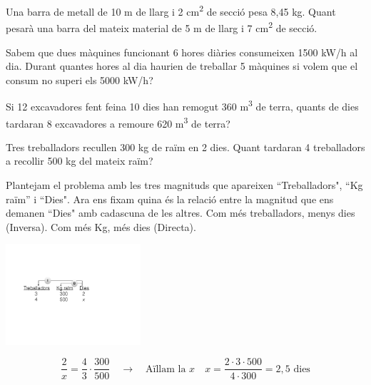  
 \begin{mylist}
 
 \exer
 Una barra de metall de 10 m de llarg i 2 cm\textsuperscript{2} de
 secció pesa 8,45 kg. Quant pesarà una barra del mateix material de 5 m
 de llarg i 7 cm\textsuperscript{2} de secció.
 
 
 \exer
 Sabem que dues màquines funcionant 6 hores diàries consumeixen 1500
 kW/h al dia. Durant quantes hores al dia haurien de treballar 5
 màquines si volem que el consum no superi els 5000 kW/h?
 
 
 \exer
 Si 12 excavadores fent feina 10 dies han remogut 360
 m\textsuperscript{3} de terra, quants de dies tardaran 8 excavadores a
 remoure 620 m\textsuperscript{3} de terra?
 
  
\exer Tres treballadors recullen 300 kg de raïm en 2 dies. Quant tardaran 4 treballadors a recollir 500 kg del mateix raïm?
 

\end{mylist}

\begin{example}
	
	\begin{minipage}{0.6\textwidth}
		Plantejam el problema amb les tres magnituds que apareixen ``Treballadors", ``Kg raïm'' i ``Dies". 
		Ara ens fixam quina és la relació entre la magnitud que ens demanen ``Dies" amb cadascuna de les altres.
		Com més treballadors, menys dies (Inversa). Com més Kg, més dies (Directa).
		
	\end{minipage}
	\begin{minipage}{0.4\textwidth}
		\centering
		\includegraphics[width=5cm]{img-07/proporcionalitat2}
	\end{minipage}
	
	\[ \frac{2}{x} = \boxed{ \frac{4}{3} } \cdot \frac{300}{500} \quad \rightarrow \quad \text{Aïllam la }x \quad x=\frac{2\cdot 3 \cdot 500}{4\cdot 300}= 2,5 \text{ dies}  \]
	
\end{example}
 
